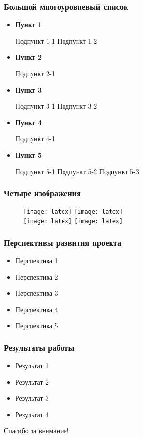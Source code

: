 \begin{frame}
\frametitle{Большой многоуровневый список}
\begin{itemize}
  \item \textbf{Пункт 1}
    \begin{itemize}
      \itemi Подпункт 1-1
      \itemi Подпункт 1-2
    \end{itemize}
  \item \textbf{Пункт 2}
    \begin{itemize}
      \itemi Подпункт 2-1
    \end{itemize}
  \item \textbf{Пункт 3}
    \begin{itemize}
      \itemi Подпункт 3-1
      \itemi Подпункт 3-2
    \end{itemize}
  \item \textbf{Пункт 4}
    \begin{itemize}
      \itemi Подпункт 4-1
    \end{itemize}
  \item \textbf{Пункт 5}
    \begin{itemize}
      \itemi Подпункт 5-1
      \itemi Подпункт 5-2
      \itemi Подпункт 5-3
    \end{itemize}
\end{itemize}
\end{frame}

\begin{frame}
\frametitle{Четыре изображения}
\begin{figure}[H]
  \center
    \texttt{[image: latex]}
    \texttt{[image: latex]}\\
    \texttt{[image: latex]}
    \texttt{[image: latex]}
\end{figure}
\end{frame}

\begin{frame}
\frametitle{Перспективы развития проекта}
\begin{itemize}
  \item Перспектива 1
  \item Перспектива 2
  \item Перспектива 3
  \item Перспектива 4
  \item Перспектива 5
\end{itemize}
\end{frame}

\begin{frame}
\frametitle{Результаты работы}
\begin{itemize}
  \item Результат 1
  \item Результат 2
  \item Результат 3
  \item Результат 4
\end{itemize}
\end{frame}

\begin{frame}[plain] %
\begin{center}
Спасибо за внимание!
\end{center}
\end{frame}
